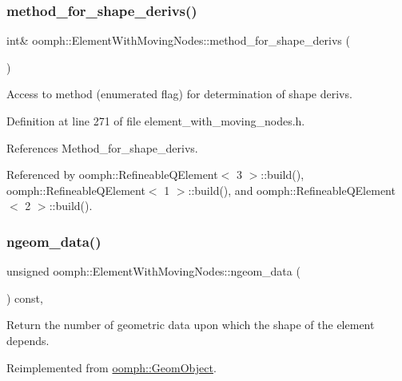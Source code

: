 \subsubsection{\texorpdfstring{method\+\_\+for\+\_\+shape\+\_\+derivs()}{method\_for\_shape\_derivs()}}
{\footnotesize\ttfamily int\& oomph\+::\+Element\+With\+Moving\+Nodes\+::method\+\_\+for\+\_\+shape\+\_\+derivs (\begin{DoxyParamCaption}{ }\end{DoxyParamCaption})\hspace{0.3cm}{\ttfamily [inline]}}



Access to method (enumerated flag) for determination of shape derivs. 



Definition at line 271 of file element\+\_\+with\+\_\+moving\+\_\+nodes.\+h.



References Method\+\_\+for\+\_\+shape\+\_\+derivs.



Referenced by oomph\+::\+Refineable\+Q\+Element$<$ 3 $>$\+::build(), oomph\+::\+Refineable\+Q\+Element$<$ 1 $>$\+::build(), and oomph\+::\+Refineable\+Q\+Element$<$ 2 $>$\+::build().

\mbox{\label{classoomph_1_1ElementWithMovingNodes_acd9274afc02b66bb15b368e359c40a6f}} 
\subsubsection{\texorpdfstring{ngeom\+\_\+data()}{ngeom\_data()}}
{\footnotesize\ttfamily unsigned oomph\+::\+Element\+With\+Moving\+Nodes\+::ngeom\+\_\+data (\begin{DoxyParamCaption}{ }\end{DoxyParamCaption}) const\hspace{0.3cm}{\ttfamily [inline]}, {\ttfamily [virtual]}}



Return the number of geometric data upon which the shape of the element depends. 



Reimplemented from \hyperlink{classoomph_1_1GeomObject_a19d325347e19964e127fe124df56f251}{oomph\+::\+Geom\+Object}.



